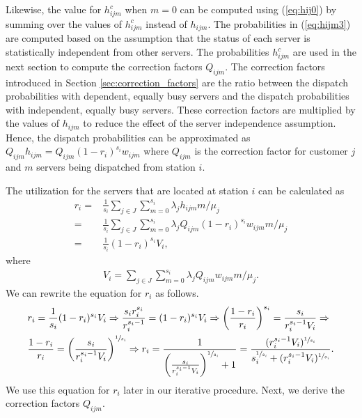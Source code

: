 \documentclass[11pt]{article}\topmargin 0mm
\begin{document}
Likewise, the value for $h_{ijm}^c$ when $m=0$ can be computed
using (\ref{eq:hij0}) by summing over the values of $h_{ijm}^c$
instead of $h_{ijm}$. The probabilities in (\ref{eq:hijm3}) are
computed based on the assumption that the status of each server
is statistically independent from other servers. The
probabilities $h_{ijm}^c$ are used in the next section to
compute the correction factors $Q_{ijm}$. The correction
factors introduced in Section \ref{sec:correction_factors} are
the ratio between the dispatch probabilities with dependent,
equally busy servers and the dispatch probabilities with
independent, equally busy servers. These correction factors are
multiplied by the values of $h_{ijm}$ to reduce the effect of
the server independence assumption. Hence, the dispatch
probabilities can be approximated as $Q_{ijm} h_{ijm} = Q_{ijm}
(1-r_i)^{s_i} w_{ijm}$ where $Q_{ijm}$ is the correction factor
for customer $j$ and $m$ servers being dispatched from station
$i$.

The utilization for the servers that are located at station $i$
can be calculated as
\begin{equation}
\label{eq:ri}
\begin{split}
r_i = & \frac{1}{s_i} \sum_{j\in J} \sum_{m=0}^{s_i} \lambda_j h_{ijm} m / \mu_{j} \\
= & \frac{1}{s_i} \sum_{j\in J} \sum_{m=0}^{s_i} \lambda_j Q_{ijm} (1-r_i)^{s_i} w_{ijm} m / \mu_{j} \\
= & \frac{1}{s_i} (1-r_i)^{s_i} V_i,
\end{split}
\end{equation}
where
\begin{equation}
\label{eq:Vi}
\begin{split}
V_i = \sum_{j\in J} \sum_{m=0}^{s_i} \lambda_j Q_{ijm} w_{ijm} m / \mu_{j}.
\end{split}
\end{equation}
We can rewrite the equation for $r_i$ as follows.
\begin{equation}
\label{eq:ri2}
\begin{split}
& r_i = \frac{1}{s_i} (1-r_i)^{s_i} V_i \Rightarrow \frac{s_i r_i^{s_i}}{r_i^{s_i-1}} = (1-r_i)^{s_i} V_i \Rightarrow \left( \frac{1-r_i}{r_i} \right)^{s_i} = \frac{s_i}{r_i^{s_i-1}V_i} \Rightarrow \\
& \frac{1-r_i}{r_i} = \left( \frac{s_i}{r_i^{s_i-1}V_i} \right)^{\sfrac{1}{s_i}} \Rightarrow r_i = \frac{1}{\left( \frac{s_i}{r_i^{s_i-1}V_i} \right)^{\sfrac{1}{s_i}}+1} = \frac{(r_i^{s_i-1} V_i)^{\sfrac{1}{s_i}}}{s_i^{\sfrac{1}{s_i}} + (r_i^{s_i-1} V_i)^{\sfrac{1}{s_i}}}.
\end{split}
\end{equation}
We use this equation for $r_i$ later in our iterative
procedure. Next, we derive the correction factors $Q_{ijm}$.
\end{document}
